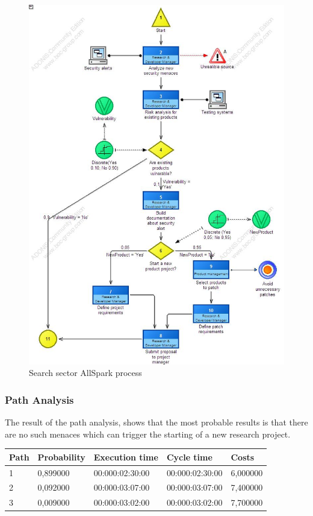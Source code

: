 \begin{figure}[!ht]
\begin{centering}
\includegraphics[scale=0.50]{assign2/adonis/imgs/sector.jpg}
\caption{Search sector AllSpark process}
\label{2img:sector}
\end{centering}
\end{figure}

\subsubsection{Path Analysis}
The result of the path analysis, shows that the most probable results is
that there are no such menaces which can trigger the starting of a new
research project.

\begin{table}[ht!]
\centering
\begin{tabular}{|l|l|l|l|l|}
\hline
Path&Probability&Execution time&Cycle time&Costs\\
\hline
1&0,899000&00:000:02:30:00&00:000:02:30:00&6,000000\\
\hline
2&0,092000&00:000:03:07:00&00:000:03:07:00&7,400000\\
\hline
3&0,009000&00:000:03:02:00&00:000:03:02:00&7,700000\\
\hline
\end{tabular}
\end{table}

